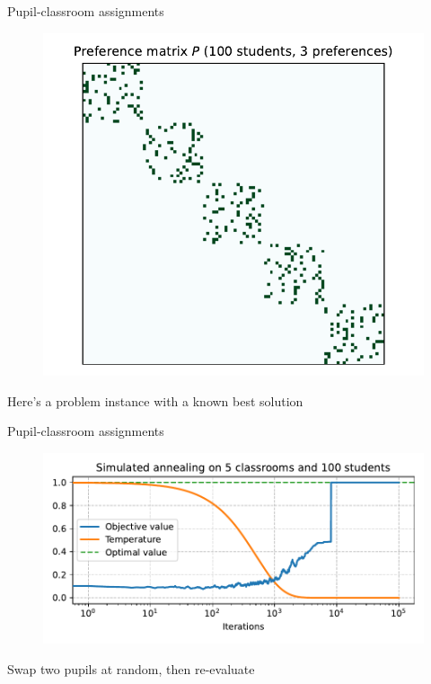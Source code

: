 \documentclass[12pt, aspectratio=149]{beamer}
\theoremstyle{plain}
\begin{document}
\begin{frame}[fragile]{Pupil-classroom assignments}
\vspace*{-1.5em}
\begin{center}
 \begin{figure}
    	\centering
    	\includegraphics[width=0.6\linewidth]{figures/classroom_matrix_structures.pdf}
 \end{figure}
 \end{center}
\vspace*{-2em}
\begin{center}
Here's a problem instance with a known best solution
\end{center}
\end{frame}

\begin{frame}[fragile]{Pupil-classroom assignments}
\vspace*{-1.5em}
\begin{center}
 \begin{figure}
    	\centering
    	\includegraphics[width=0.99\linewidth]{figures/classroom_sim_annealing.pdf}
 \end{figure}
 \end{center}
\vspace*{-2em}
\begin{center}
Swap two pupils at random, then re-evaluate
\end{center}
\end{frame}
\end{document}
